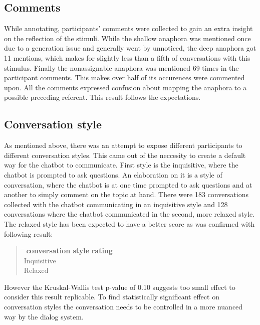 \subsection{Comments}

While annotating, participants' comments were collected
to gain an extra insight on the reflection of the stimuli.
While the shallow anaphora was mentioned once due to a generation issue
and generally went by unnoticed,
the deep anaphora got 11 mentions, which makes for
slightly less than a fifth of conversations with this stimulus.
Finally the nonassignable anaphora was mentioned 69 times in the participant comments.
This makes over half of its occurences were commented upon.
All the comments expressed confusion about mapping the anaphora to a possible preceding referent.
This result follows the expectations.

\subsection{Conversation style}

As mentioned above, there was an attempt
to expose different participants to different conversation styles.
This came out of the neccesity to create a default way for the chatbot to communicate.
First style is the inquisitive, where the chatbot is prompted to ask questions.
An elaboration on it is a style of conversation,
where the chatbot is at one time prompted to ask questions and
at another to simply comment on the topic at hand.
There were 183 conversations collected with the chatbot communicating in an inquisitive style
and 128 conversations where the chatbot communicated in the second, more relaxed style.
The relaxed style has been expected to have a better score as was confirmed
with following result:

\begin{quote}
\begin{tabbing}
\hspace{4cm} \= \hspace{3cm} \kill %
\textbf{conversation style} \> \textbf{rating} \\
Inquisitive \\
Relaxed  \\
\end{tabbing}
\end{quote}

However the Kruskal-Wallis test p-value of 0.10 suggests too small effect
to consider this result replicable.
To find statistically significant effect on conversation styles
the conversation needs to be controlled in a more nuanced way by the dialog system.

